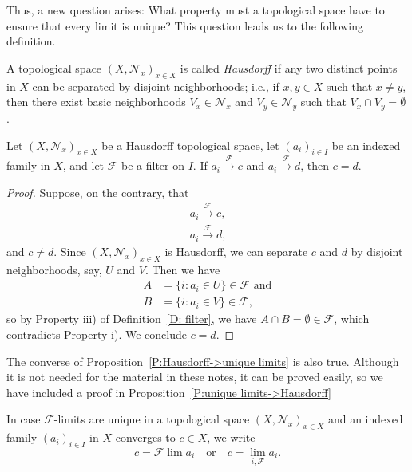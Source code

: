 \documentclass{scrartcl}
\begin{document}
Thus, a new question arises: What property must a topological space have to ensure that every limit is unique?
This question leads us to the following definition.

\begin{definition}
A topological space $(X,\mathscr{N}_x)_{x\in X}$ is called \emph{Hausdorff} if any two distinct points in $X$ can be separated by disjoint neighborhoods; i.e., if $x,y\in X$ such that $x\not =y$, then there exist basic neighborhoods $V_x\in\mathscr{N}_x$ and $V_y\in\mathscr{N}_y$ such that $V_x\cap V_y=\emptyset$.
\end{definition}

\begin{proposition}
\label{P:Hausdorff->unique limits}
Let $(X,\mathscr{N}_x)_{x\in X}$ be a Hausdorff topological space, let $(a_i)_{i\in I}$ be an indexed family in $X$, and let $\mathscr{F}$ be a filter on $I$.
If $a_i\overset{\mathscr{F}}\to c$ and $a_i\overset{\mathscr{F}}\to d$, then $c=d$.
\end{proposition}

\begin{proof}
Suppose, on the contrary, that 
\begin{align*}
a_i\overset{\mathscr{F}}\to c \text{,}\\
a_i\overset{\mathscr{F}}\to d\text{,}
\end{align*}
and $c\not=d$. Since $(X,\mathscr{N}_x)_{x\in X}$ is Hausdorff, we can separate $c$ and $d$ by disjoint neighborhoods, say, $U$ and $V$. Then we have
\begin{align*}
A&=\{i \colon a_i\in U\}\in\mathscr{F} \text{ and}\\
B&=\{i \colon a_i\in V\}\in\mathscr{F}\text{,}
\end{align*}
so by Property iii) of Definition~\ref{D: filter}, we have $A\cap B=\emptyset\in \mathscr{F}$, which contradicts Property i). We conclude $c=d$.
\end{proof}


The converse of Proposition~\ref{P:Hausdorff->unique limits} is also true. Although it is not needed for the material in these notes, it can be proved easily, so we have included a proof in Proposition~\ref{P:unique limits->Hausdorff}

\begin{notation}
In case $\mathscr{F}$-limits are unique in a topological space $(X,\mathscr{N}_x)_{x\in X}$ and an indexed family $(a_i)_{i\in I}$ in $X$ converges to $c\in X$, we write 
\[
c=\mathscr{F}\lim a_i \quad \text{or} \quad c= \lim\limits_{i,\mathscr{F}}a_i \text{.}
\]
\end{notation}
\end{document}
